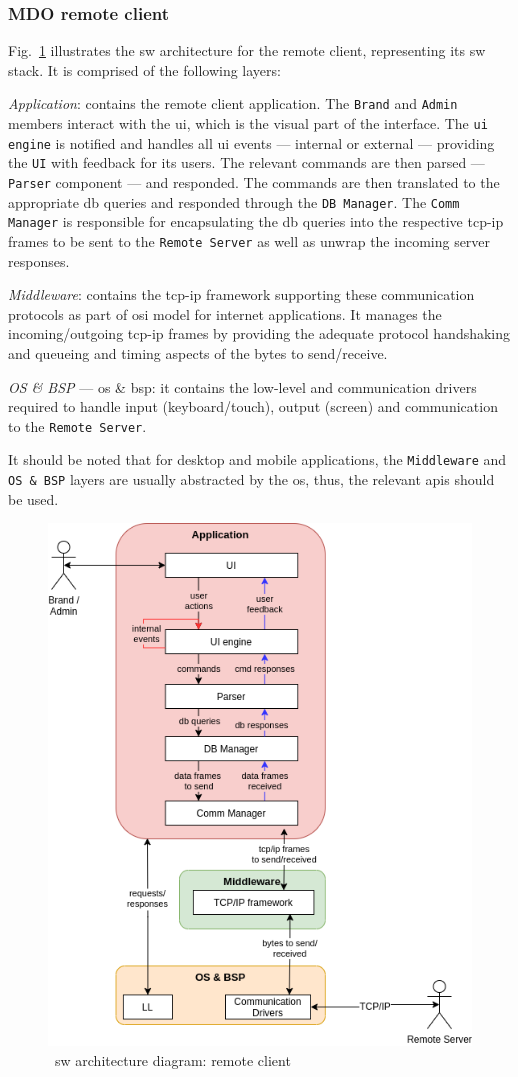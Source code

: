 \subsubsection{MDO remote client}
\label{sec:mdo-remote-client}
Fig.~\ref{fig:sw-arch-rc} illustrates the \gls{sw} architecture for the remote
client, representing its \gls{sw} stack.
It is comprised of the following layers:
\begin{item-c}
\item \emph{Application}: contains the remote client application. The
  \texttt{Brand} and \texttt{Admin} members interact with the \gls{ui}, which is
  the visual part of the interface. The \texttt{\gls{ui} engine} is notified and
  handles all \gls{ui} events --- internal or external --- providing the \texttt{UI}
  with feedback for its users. The relevant commands
  are then parsed --- \texttt{Parser} component --- and responded. The commands
  are then translated to the appropriate \gls{db} queries and responded through
  the \texttt{DB Manager}. The \texttt{Comm Manager} is responsible for
  encapsulating the \gls{db} queries into the respective \gls{tcp-ip} frames to
  be sent to the \texttt{Remote Server} as well as unwrap the incoming server
  responses.
\item \emph{Middleware}: contains the \gls{tcp-ip} framework supporting these
  communication protocols as part of \gls{osi} model for internet
  applications. It manages the incoming/outgoing \gls{tcp-ip} frames by
  providing the adequate protocol handshaking and queueing and timing aspects of
  the bytes to send/receive.
\item \emph{OS \& BSP} --- \gls{os} \& \gls{bsp}: it contains the low-level and
  communication drivers required to handle input (keyboard/touch), output
  (screen) and communication to the \texttt{Remote Server}.
\end{item-c}
It should be noted that for desktop and mobile applications, the
\texttt{Middleware} and \texttt{OS \& BSP} layers are usually abstracted by the
\gls{os}, thus, the relevant \gls{api}s should be used.
%
\begin{figure}
\centering
    \includegraphics[width=0.55\columnwidth]{./img/sw-arch-rc.png}
  \caption{~\gls{sw} architecture diagram: remote client}%
\label{fig:sw-arch-rc}
\end{figure}

